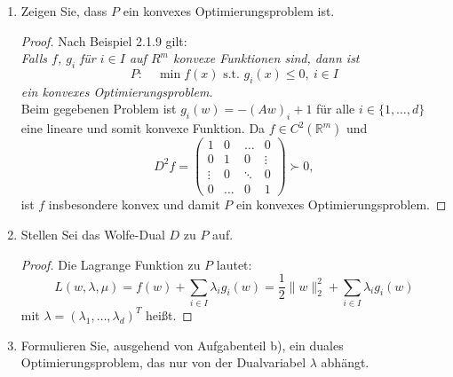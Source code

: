 \documentclass[12pt]{extreport} %
\newcommand{\R}{\mathbb{R}}
\theoremstyle{named}
\theoremstyle{nnamed}
\theoremstyle{itshape}
\theoremstyle{normal}
\begin{document}
\begin{enumerate}
\begin{proof}
			$$ f(x^\nu) = \frac{1}{2} \| x^\nu \|_2^2 \longrightarrow +\infty. $$
			Damit sind alle Voraussetzungen von Korollar 1.2.40 erfüllt, $S$ ist somit nicht-leer und kompakt und somit $P$ lösbar.
		\end{proof}
	\item Zeigen Sie, dass $P$ ein konvexes Optimierungsproblem ist.
		\begin{proof}
		Nach Beispiel 2.1.9 gilt: ~\\
			\textit{Falls $f$, $g_i$ für $i \in I$ auf $R^m$ konvexe Funktionen sind, dann ist}
			$$P: \quad \min f(x) \text{ s.t. } g_i (x) \leq 0, ~ i \in I $$
			\textit{ein konvexes Optimierungsproblem.} ~\\
			
			Beim gegebenen Problem ist $g_i(w) = - (A w)_i + 1$ für alle $i \in \{1, \dotsc, d \}$ eine lineare und somit konvexe Funktion. Da $f \in C^2(\R^m)$ und 
			$$ D^2 f =  \left(\begin{array}{rrrrr} 1 & 0 & \dotsc & 0 \\ 0 & 1 & 0 & \vdots \\ \vdots & 0 & \ddots & 0\\ 0 &  \dotsc & 0 & 1 \end{array}\right) \succ 0, $$
			ist $f$ insbesondere konvex und damit $P$ ein konvexes Optimierungsproblem.
		\end{proof}
	\item Stellen Sei das Wolfe-Dual $D$ zu $P$ auf.
		\begin{proof}
			Die Lagrange Funktion zu $P$ lautet:
			$$ L(w, \lambda, \mu) = f(w) + \sum_{i \in I} \lambda_i g_i(w) = \frac{1}{2} \| w \|_2^2 + \sum_{i \in I} \lambda_i g_i(w) $$
			mit $\lambda = \left( \lambda_1, \dotsc, \lambda_d \right)^T$ heißt.
		\end{proof}
	\item Formulieren Sie, ausgehend von Aufgabenteil b), ein duales Optimierungsproblem, das nur von der Dualvariabel $\lambda$ abhängt.
\end{enumerate}
\end{document}
